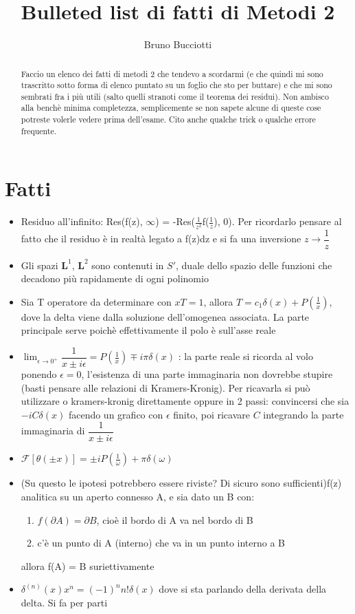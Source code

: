 \documentclass[12pt,a4paper]{article}
\title{Bulleted list di fatti di Metodi 2}
\author{Bruno Bucciotti}
\begin{document}
\maketitle

\begin{abstract}
Faccio un elenco dei fatti di metodi 2 che tendevo a scordarmi (e che quindi mi sono trascritto sotto forma di elenco puntato su un foglio che sto per buttare) e che mi sono sembrati fra i più utili (salto quelli stranoti come il teorema dei residui). Non ambisco alla benchè minima completezza, semplicemente se non sapete alcune di queste cose potreste volerle vedere prima dell'esame. Cito anche qualche trick o qualche errore frequente.
\end{abstract}

\section{Fatti}

\begin{itemize}
	\item Residuo all'infinito: Res(f(z), $\infty$) = -Res($\frac{1}{z^2}$f($\frac{1}{z}$),  0). Per ricordarlo pensare al fatto che il residuo è in realtà legato a f(z)dz e si fa una inversione $z\rightarrow \dfrac{1}{z}$
	\item Gli spazi $\mathbf{L}^1,\,\mathbf{L}^2$ sono contenuti in $S'$, duale dello spazio delle funzioni che decadono più rapidamente di ogni polinomio
	\item Sia T operatore da determinare con $xT = 1$, allora $T = c_1\delta(x) + P(\frac{1}{x})$, dove la delta viene dalla soluzione dell'omogenea associata. La parte principale serve poichè effettivamente il polo è sull'asse reale
	\item $\lim_{\epsilon \to 0^+} \dfrac{1}{x\pm i \epsilon} = P(\frac{1}{x}) \mp i \pi \delta(x)$ : la parte reale si ricorda al volo ponendo $\epsilon=0$, l'esistenza di una parte immaginaria non dovrebbe stupire (basti pensare alle relazioni di Kramers-Kronig). Per ricavarla si può utilizzare o kramers-kronig direttamente oppure in 2 passi: convincersi che sia $-iC\delta(x)$ facendo un grafico con $\epsilon$ finito, poi ricavare $C$ integrando la parte immaginaria di $\dfrac{1}{x\pm i \epsilon}$
	\item $\mathcal{F}[\theta(\pm x)] = \pm i P(\frac{1}{\omega}) + \pi \delta(\omega)$
	\item (Su questo le ipotesi potrebbero essere riviste? Di sicuro sono sufficienti)f(z) analitica su un aperto connesso A, e sia dato un B con:
	\begin{enumerate}
		\item $f(\partial A) = \partial B$, cioè il bordo di A va nel bordo di B
		\item c'è un punto di A (interno) che va in un punto interno a B
	\end{enumerate}
	allora f(A) = B suriettivamente
	\item $\delta^{(n)} (x) x^n = (-1)^n n! \delta(x)$ dove si sta parlando della derivata della delta. Si fa per parti
\end{itemize}
\end{document}
